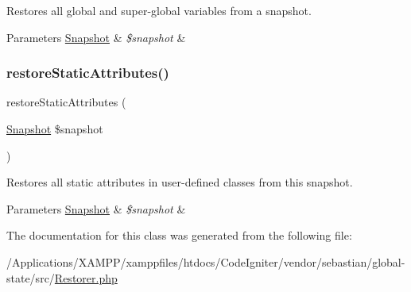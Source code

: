 Restores all global and super-\/global variables from a snapshot.


\begin{DoxyParams}[1]{Parameters}
\mbox{\hyperlink{class_sebastian_bergmann_1_1_global_state_1_1_snapshot}{Snapshot}} & {\em \$snapshot} & \\
\hline
\end{DoxyParams}
\mbox{\label{class_sebastian_bergmann_1_1_global_state_1_1_restorer_af31a3b378cbf1e26ce46b134064ec297}} 
\subsubsection{\texorpdfstring{restore\+Static\+Attributes()}{restoreStaticAttributes()}}
{\footnotesize\ttfamily restore\+Static\+Attributes (\begin{DoxyParamCaption}\item[{\mbox{\hyperlink{class_sebastian_bergmann_1_1_global_state_1_1_snapshot}{Snapshot}}}]{\$snapshot }\end{DoxyParamCaption})}

Restores all static attributes in user-\/defined classes from this snapshot.


\begin{DoxyParams}[1]{Parameters}
\mbox{\hyperlink{class_sebastian_bergmann_1_1_global_state_1_1_snapshot}{Snapshot}} & {\em \$snapshot} & \\
\hline
\end{DoxyParams}


The documentation for this class was generated from the following file\+:\begin{DoxyCompactItemize}
\item 
/\+Applications/\+X\+A\+M\+P\+P/xamppfiles/htdocs/\+Code\+Igniter/vendor/sebastian/global-\/state/src/\mbox{\hyperlink{_restorer_8php}{Restorer.\+php}}\end{DoxyCompactItemize}

